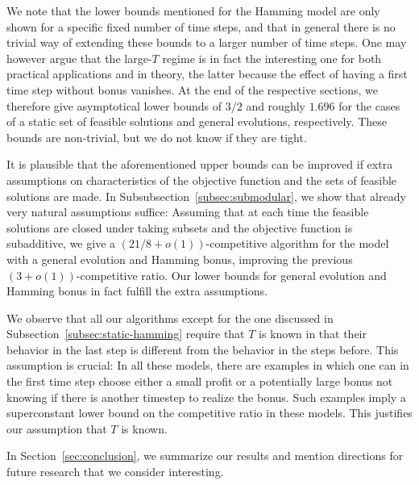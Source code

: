 \documentclass[a4paper]{book}
\newcommand{\finalversion}[1]{#1}
\begin{document}
We note that the lower bounds mentioned for the Hamming model are only shown for a specific fixed number of time steps, and that in general there is no trivial way of extending these bounds to a larger number of time steps. 
One may however argue that the large-$T$ regime is in fact the interesting one for both practical applications and in theory, the latter because the effect of having a first time step without bonus vanishes. At the end of the respective sections, we therefore give asymptotical lower bounds of $3/2$ and roughly $1.696$ for the cases of a static set of feasible solutions and general evolutions, respectively. These bounds are non-trivial, but we do not know if they are tight.

It is plausible that the aforementioned upper bounds can be improved if extra assumptions on characteristics of the objective function and the sets of feasible solutions are made. In Subsubsection~\ref{subsec:submodular}, we show that already very natural assumptions suffice: Assuming that at each time the feasible solutions are closed under taking subsets and the objective function is \finalversion{subadditive}, we give a $(21/8+o(1))$-competitive algorithm for the model with a general evolution and Hamming bonus, improving the previous $(3+o(1))$-competitive ratio. Our  lower bounds for general evolution and Hamming bonus in fact fulfill the extra assumptions.

\finalversion{We observe that all our algorithms except for the one discussed in Subsection~\ref{subsec:static-hamming} require that $T$ is known in that their behavior in the last step is different from the behavior in the steps before. This assumption is crucial: In all these models, there are examples in which one can in the first time step choose either a small profit or a potentially large bonus not knowing if there is another timestep to realize the bonus. Such examples imply a superconstant lower bound on the competitive ratio in these models. This justifies our assumption that $T$ is known.}

In Section~\ref{sec:conclusion}, we summarize our results and mention directions for future research that we consider interesting.

\end{document}
